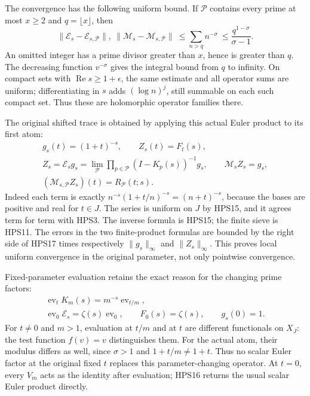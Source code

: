 The convergence has the following uniform bound.
If $\mathcal P$ contains every prime at most
$x\ge2$ and $q=\lfloor x\rfloor$, then
\begin{equation}\tag{HPS17}
 \|\mathcal E_s-\mathcal E_{s,\mathcal P}\|,
 \ \|\mathcal M_s-\mathcal M_{s,\mathcal P}\|
 \ \le\sum_{n>q}n^{-\sigma}
 \ \le\frac{q^{1-\sigma}}{\sigma-1}.
\end{equation}
An omitted integer has a prime divisor greater
than $x$, hence is greater than $q$.
The decreasing function $v^{-\sigma}$ gives
the integral bound from $q$ to infinity.
On compact sets with $\operatorname{Re}s\ge
1+\epsilon$, the same estimate and all
operator sums are uniform; differentiating
in $s$ adds $(\log n)^j$, still summable
on each such compact set. Thus these are
holomorphic operator families there.

The original shifted trace is obtained by applying
this actual Euler product to its first atom:
\begin{equation}\tag{HPS18}
\begin{gathered}
 g_s(t)=(1+t)^{-s},\qquad Z_s(t)=F_t(s),\\
 Z_s=\mathcal E_sg_s
     =\lim_{\mathcal P}
             \prod_{p\in\mathcal P}(I-K_p(s))^{-1}g_s,
 \qquad
 \mathcal M_sZ_s=g_s,\\
 (\mathcal M_{s,\mathcal P}Z_s)(t)
           =R_{\mathcal P}(t;s).
\end{gathered}
\end{equation}
Indeed each term is exactly
$n^{-s}(1+t/n)^{-s}=(n+t)^{-s}$, because the
bases are positive and real for $t\in J$.
The series is uniform on $J$ by HPS15,
and it agrees term for term with HPS3.
The inverse formula is HPS15; the finite
sieve is HPS11. The errors in the two
finite-product formulas are bounded by
the right side of HPS17 times respectively
$\|g_s\|_\infty$ and $\|Z_s\|_\infty$.
This proves local uniform convergence in the
original parameter, not only pointwise convergence.

Fixed-parameter evaluation retains the exact
reason for the changing prime factors:
\begin{equation}\tag{HPS19}
\begin{gathered}
 \operatorname{ev}_tK_m(s)
                =m^{-s}\operatorname{ev}_{t/m},\\
 \operatorname{ev}_0\mathcal E_s
                =\zeta(s)\operatorname{ev}_0,\qquad
 F_0(s)=\zeta(s),\qquad g_s(0)=1.
\end{gathered}
\end{equation}
For $t\ne0$ and $m>1$, evaluation at $t/m$
and at $t$ are different functionals on $X_J$:
the test function $f(v)=v$ distinguishes them.
For the actual atom, their modulus differs
as well, since $\sigma>1$ and
$1+t/m\ne1+t$.
Thus no scalar Euler factor at the original
fixed $t$ replaces this parameter-changing
operator. At $t=0$, every $V_m$ acts as the
identity after evaluation; HPS16 returns
the usual scalar Euler product directly.

